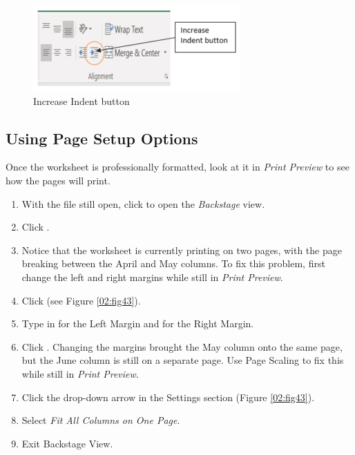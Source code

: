 \begin{figure}[H]
	\centering
	\includegraphics[width=\maxwidth{.95\linewidth}]{gfx/ch02_fig42}
	\caption{Increase Indent button}
	\label{02:fig42}
\end{figure}

\subsection{Using Page Setup Options}

Once the worksheet is professionally formatted, look at it in \textit{Print Preview} to see how the pages will print.

\begin{enumerate}
	\item With the  file still open, click  to open the \textit{Backstage} view. 
	\item Click .
	\item Notice that the worksheet is currently printing on two pages, with the page breaking between the April and May columns. To fix this problem, first change the left and right margins while still in \textit{Print Preview}.
	\item Click  (see Figure \ref{02:fig43}).
	\item Type in  for the Left Margin and  for the Right Margin.
	\item Click . Changing the margins brought the May column onto the same page, but the June column is still on a separate page. Use Page Scaling to fix this while still in \textit{Print Preview}.
	\item Click the  drop-down arrow in the Settings section (Figure \ref{02:fig43}).
	\item Select \textit{Fit All Columns on One Page}.
	\item Exit Backstage View.
\end{enumerate}

